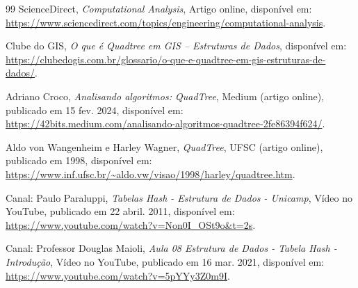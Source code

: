 \documentclass{sbc2023}%
\begin{document}
\begin{thebibliography}{99}
ScienceDirect,  
\textit{Computational Analysis},  
Artigo online, disponível em: \url{https://www.sciencedirect.com/topics/engineering/computational-analysis}.

Clube do GIS,  
\textit{O que é Quadtree em GIS -- Estruturas de Dados},  
disponível em: \url{https://clubedogis.com.br/glossario/o-que-e-quadtree-em-gis-estruturas-de-dados/}.

Adriano Croco,  
\textit{Analisando algoritmos: QuadTree},  
Medium (artigo online), publicado em 15 fev. 2024, disponível em: \url{https://42bits.medium.com/analisando-algoritmos-quadtree-2fe86394f624/}.

Aldo von Wangenheim e Harley Wagner,  
\textit{QuadTree},  
UFSC (artigo online), publicado em 1998, disponível em: \url{https://www.inf.ufsc.br/~aldo.vw/visao/1998/harley/quadtree.htm}.

Canal: Paulo Paraluppi,  
\textit{Tabelas Hash - Estrutura de Dados - Unicamp},  
Vídeo no YouTube, publicado em 22 abril. 2011, disponível em: \url{https://www.youtube.com/watch?v=Non0I_OSt9o&t=2s}.

Canal: Professor Douglas Maioli,  
\textit{Aula 08 Estrutura de Dados - Tabela Hash - Introdução},  
Vídeo no YouTube, publicado em 16 mar. 2021, disponível em: \url{https://www.youtube.com/watch?v=5pYYy3Z0m9I}.

\end{thebibliography}
\end{document}
